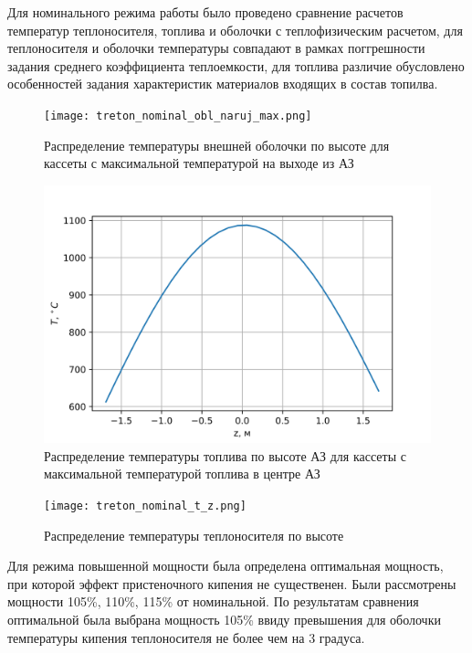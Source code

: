 Для номинального режима работы было проведено сравнение расчетов температур теплоносителя, топлива и оболочки с теплофизическим расчетом, для теплоносителя и оболочки температуры совпадают в рамках поггрешности задания среднего коэффициента теплоемкости, для топлива различие обусловлено особенностей задания характеристик материалов входящих в состав топилва.

\begin{figure}[H]
	\begin{center}
		\texttt{[image: treton\_nominal\_obl\_naruj\_max.png]}
		\caption{Распределение температуры внешней оболочки по высоте для кассеты с максимальной температурой на выходе из АЗ}
	\end{center}
\end{figure}

\begin{figure}[H]
	\begin{center}
		\includegraphics{treton_nominal_t_fuel_max.png}
		\caption{Распределение температуры топлива по высоте АЗ для кассеты с максимальной температурой топлива в центре АЗ}
	\end{center}
\end{figure}

\begin{figure}[H]
	\begin{center}
		\texttt{[image: treton\_nominal\_t\_z.png]}
		\caption{Распределение температуры теплоносителя по высоте}
	\end{center}
\end{figure}

Для режима повышенной мощности была определена оптимальная мощность, при которой эффект пристеночного кипения не существенен. Были рассмотрены мощности 105\%, 110\%, 115\% от номинальной. По результатам сравнения оптимальной была выбрана мощность 105\% ввиду превышения для оболочки температуры кипения теплоносителя не более чем на 3 градуса. 

